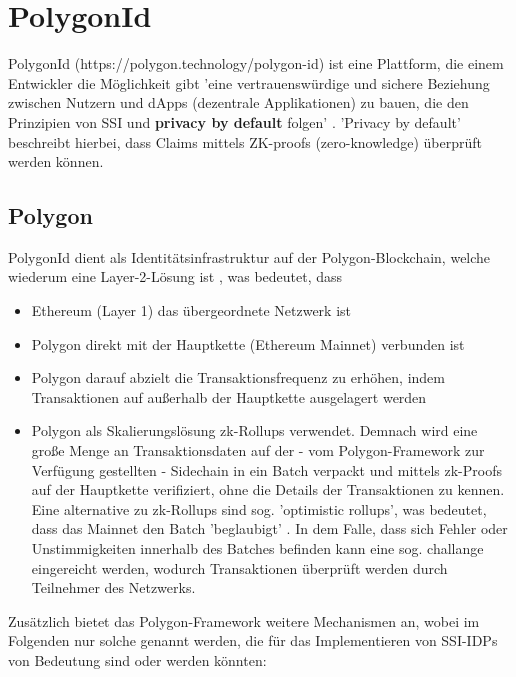 \section{PolygonId}
PolygonId (https://polygon.technology/polygon-id) ist eine Plattform, die einem Entwickler die Möglichkeit gibt 'eine vertrauenswürdige und sichere Beziehung zwischen Nutzern und dApps (dezentrale Applikationen) zu bauen, die den Prinzipien von SSI und \textbf{privacy by default} folgen' \cite{ID31}.
'Privacy by default' beschreibt hierbei, dass Claims mittels ZK-proofs (zero-knowledge) überprüft werden können. 

\subsection{Polygon}
PolygonId dient als Identitätsinfrastruktur auf der Polygon-Blockchain, welche wiederum eine Layer-2-Lösung ist \cite{ID34}, was bedeutet, dass 
\begin{itemize}
	\item Ethereum (Layer 1) das übergeordnete Netzwerk ist
	\item Polygon direkt mit der Hauptkette (Ethereum Mainnet) verbunden ist
	\item Polygon darauf abzielt die Transaktionsfrequenz zu erhöhen, indem Transaktionen auf außerhalb der Hauptkette ausgelagert werden
	\item Polygon als Skalierungslösung zk-Rollups verwendet. Demnach wird eine große Menge an Transaktionsdaten auf der - vom Polygon-Framework zur Verfügung gestellten - Sidechain in ein Batch verpackt und mittels zk-Proofs auf der Hauptkette verifiziert, ohne die Details der Transaktionen zu kennen. Eine alternative zu zk-Rollups sind sog. 'optimistic rollups', was bedeutet, dass das Mainnet den Batch 'beglaubigt' \cite{ID35}. In dem Falle, dass sich Fehler oder Unstimmigkeiten innerhalb des Batches befinden kann eine sog. challange eingereicht werden, wodurch Transaktionen überprüft werden durch Teilnehmer des Netzwerks.
\end{itemize}
Zusätzlich bietet das Polygon-Framework weitere Mechanismen an, wobei im Folgenden nur solche genannt werden, die für das Implementieren von SSI-IDPs von Bedeutung sind oder werden könnten:
